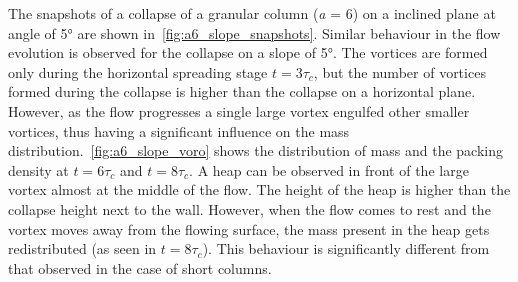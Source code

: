 The snapshots of a collapse of a granular column (\textit{a} = 6) on a inclined 
plane at angle of 5\si{\degree} are shown in~\cref{fig:a6_slope_snapshots}. 
Similar behaviour in the flow evolution is observed for the collapse on a slope 
of 5\si{\degree}. The vortices are formed only during the horizontal spreading 
stage $t = 3\tau_c$, but the number of vortices formed during the collapse is 
higher than the collapse on a horizontal plane. However, as the flow progresses 
a single large vortex engulfed other smaller vortices, thus having a 
significant influence on the mass distribution.~\cref{fig:a6_slope_voro} shows 
the distribution of mass and the packing density at $t = 6\tau_c$ and $t = 
8\tau_c$. A heap can be observed in front of the large vortex almost at the 
middle of the flow. The height of the heap is higher than the collapse height 
next to the wall. However, when the flow comes to rest and the vortex moves 
away from the flowing surface, the mass present in the heap gets redistributed 
(as seen in $t = 8\tau_c$). This behaviour is significantly different from that 
observed in the case of short columns. 

